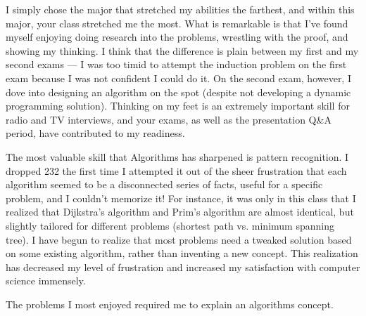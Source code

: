 \documentclass{article}
\begin{document}
I simply chose the major that stretched my abilities the farthest, and within this major, your class stretched me the most. What is remarkable is that I've found myself enjoying doing research into the problems, wrestling with the proof, and showing my thinking. I think that the difference is plain between my first and my second exams — I was too timid to attempt the induction problem on the first exam because I was not confident I could do it. On the second exam, however, I dove into designing an algorithm on the spot (despite not developing a dynamic programming solution). Thinking on my feet is an extremely important skill for radio and TV interviews, and your exams, as well as the presentation Q\&A period, have contributed to my readiness.

The most valuable skill that Algorithms has sharpened is pattern recognition. I dropped 232 the first time I attempted it out of the sheer frustration that each algorithm seemed to be a disconnected series of facts, useful for a specific problem, and I couldn't memorize it! For instance, it was only in this class that I realized that Dijkstra's algorithm and Prim's algorithm are almost identical, but slightly tailored for different problems (shortest path vs. minimum spanning tree). I have begun to realize that most problems need a tweaked solution based on some existing algorithm, rather than inventing a new concept. This realization has decreased my level of frustration and increased my satisfaction with computer science immensely. 

The problems I most enjoyed required me to explain an algorithms concept. 
\end{document}
